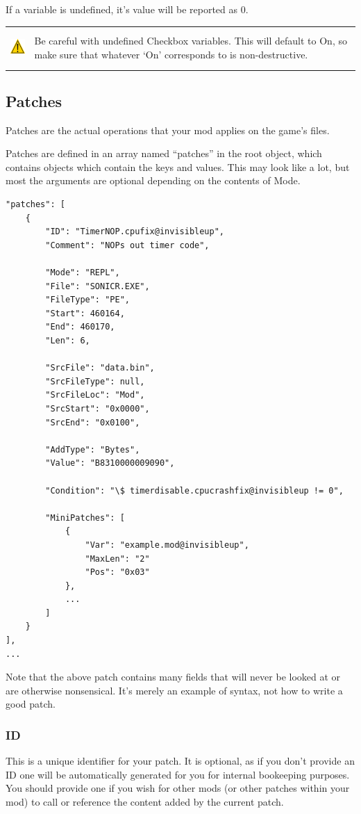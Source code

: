 \documentclass[12pt,a4paper,notitlepage]{article}
\newcommand{\warning}[1]{
    \begin{tabular}{m{1.1cm}  m{11cm}}
    &\\
    \includegraphics[width=1.1cm, height=1.1cm]{warning} & #1
    \\&\\
    \end{tabular}
}
\begin{document}
If a variable is undefined, it's value will be reported as 0.

\warning{Be careful with undefined Checkbox variables. This will default to On, so make sure that whatever `On' corresponds to is non-destructive.}

\subsection{Patches}
\label{subsec:create-patch}
Patches are the actual operations that your mod applies on the game's files.

Patches are defined in an array named ``patches'' in the root object, which contains objects which contain the keys and values. This may look like a lot, but most the arguments are optional depending on the contents of Mode.

\clearpage
\begin{lstlisting}[breaklines=true]
"patches": [
    {	
        "ID": "TimerNOP.cpufix@invisibleup",
        "Comment": "NOPs out timer code",
        
        "Mode": "REPL",
        "File": "SONICR.EXE",
        "FileType": "PE",
        "Start": 460164,
        "End": 460170,
        "Len": 6,
        
        "SrcFile": "data.bin",
        "SrcFileType": null,
        "SrcFileLoc": "Mod",
        "SrcStart": "0x0000",
        "SrcEnd": "0x0100",
        
        "AddType": "Bytes",
        "Value": "B8310000009090",
        
        "Condition": "\$ timerdisable.cpucrashfix@invisibleup != 0",
        
        "MiniPatches": [
            {
                "Var": "example.mod@invisibleup",
                "MaxLen": "2"
                "Pos": "0x03"
            },
            ...
        ]
    }
],
...
\end{lstlisting}
Note that the above patch contains many fields that will never be looked at or are otherwise nonsensical. It's merely an example of syntax, not how to write a good patch.

\subsubsection{ID}
This is a unique identifier for your patch. It is optional, as if you don't provide an ID one will be automatically generated for you for internal bookeeping purposes. You should provide one if you wish for other mods (or other patches within your mod) to call or reference the content added by the current patch.
\end{document}
